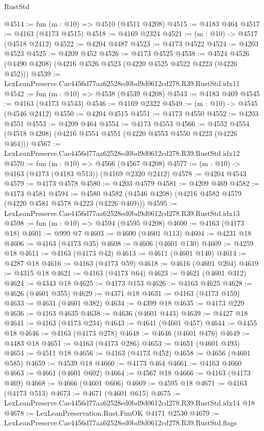 \begin{lexlean}{RustStd}
\begin{coremodule}
@4514 := fun (m : @10) => @4510 (@4511 @4208)
@4515 := @4183 @464
@4517 := @4163 (@4173 @4515)
@4518 := @4169 @2324
@4521 := (m : @10) -> @4517 (@4518 @2412)
@4522 := @4204 @4487
@4523 := @4173 @4522
@4524 := @4203 @4523
@4525 := @4209 @452
@4526 := @4173 @4525
@4538 := @4524 @4526 (@4490 @4208) (@4216 @4526 @4523 (@4220 @4525 @4522 @4223 (@4226 @452)))
@4539 := LexLeanPreserve.Cae4456d77aa62528ed0bd9d0612cd278.R39.RustStd.idx11
@4542 := fun (m : @10) => @4538 (@4539 @4208)
@4543 := @4183 @469
@4545 := @4163 (@4173 @4543)
@4546 := @4169 @2322
@4549 := (m : @10) -> @4545 (@4546 @2412)
@4550 := @4204 @4515
@4551 := @4173 @4550
@4552 := @4203 @4551
@4553 := @4209 @464
@4554 := @4173 @4553
@4566 := @4552 @4554 (@4518 @4208) (@4216 @4554 @4551 (@4220 @4553 @4550 @4223 (@4226 @464)))
@4567 := LexLeanPreserve.Cae4456d77aa62528ed0bd9d0612cd278.R39.RustStd.idx12
@4570 := fun (m : @10) => @4566 (@4567 @4208)
@4577 := (m : @10) -> @4163 (@4173 (@4183 @513)) (@4169 @2320 @2412)
@4578 := @4204 @4543
@4579 := @4173 @4578
@4580 := @4203 @4579
@4581 := @4209 @469
@4582 := @4173 @4581
@4594 := @4580 @4582 (@4546 @4208) (@4216 @4582 @4579 (@4220 @4581 @4578 @4223 (@4226 @469)))
@4595 := LexLeanPreserve.Cae4456d77aa62528ed0bd9d0612cd278.R39.RustStd.idx13
@4598 := fun (m : @10) => @4594 (@4595 @4208)
@4600 := @4163 (@4173 @18)
@4601 := @999 @7
@4603 := @4600 (@4601 @113)
@4604 := @4231 @18
@4606 := @4163 (@4173 @35)
@4608 := @4606 (@4601 @130)
@4609 := @4259 @18
@4611 := @4163 (@4173 @42)
@4613 := @4611 (@4601 @140)
@4614 := @4287 @18
@4616 := @4163 (@4173 @59)
@4618 := @4616 (@4601 @204)
@4619 := @4315 @18
@4621 := @4163 (@4173 @64)
@4623 := @4621 (@4601 @312)
@4624 := @4343 @18
@4625 := @4173 @153
@4626 := @4163 @4625
@4628 := @4626 (@4601 @355)
@4629 := @4371 @18
@4631 := @4163 (@4173 @159)
@4633 := @4631 (@4601 @382)
@4634 := @4399 @18
@4635 := @4173 @229
@4636 := @4163 @4635
@4638 := @4636 (@4601 @443)
@4639 := @4427 @18
@4641 := @4163 (@4173 @234)
@4643 := @4641 (@4601 @457)
@4644 := @4455 @18
@4646 := @4163 (@4173 @278)
@4648 := @4646 (@4601 @476)
@4649 := @4483 @18
@4651 := @4163 (@4173 @286)
@4653 := @4651 (@4601 @493)
@4654 := @4511 @18
@4656 := @4163 (@4173 @452)
@4658 := @4656 (@4601 @585)
@4659 := @4539 @18
@4660 := @4173 @464
@4661 := @4163 @4660
@4663 := @4661 (@4601 @602)
@4664 := @4567 @18
@4666 := @4163 (@4173 @469)
@4668 := @4666 (@4601 @606)
@4669 := @4595 @18
@4671 := @4163 (@4173 @513)
@4673 := @4671 (@4601 @615)
@4675 := LexLeanPreserve.Cae4456d77aa62528ed0bd9d0612cd278.R39.RustStd.idx14 @18
@4678 := LexLeanPreservation.Rust.FunOK @4171 @2530
@4679 := LexLeanPreserve.Cae4456d77aa62528ed0bd9d0612cd278.R39.RustStd.flags

\end{coremodule}
\end{lexlean}
